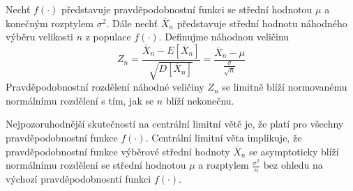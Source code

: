 \begin{theorem}
Nechť $f(\cdot)$ představuje pravděpodobnostní funkci se střední hodnotou $\mu$ a konečným rozptylem $\sigma^2$. Dále nechť $\overline{X}_n$ představuje střední hodnotu náhodného výběru velikosti $n$ z populace $f(\cdot)$. Definujme náhodnou veličinu
\begin{equation*}
Z_n = \frac{\overline{X}_n - E[\overline{X}_n]}{\sqrt{D[\overline{X}_n]}} = \frac{\overline{X}_n - \mu}{\frac{\sigma}{\sqrt{n}}}
\end{equation*}
Pravděpodobnostní rozdělení náhodné veličiny $Z_n$ se limitně blíží normovanému normálnímu rozdělení s tím, jak se $n$ blíží nekonečnu.
\end{theorem}
Nejpozoruhodnější skutečností na centrální limitní větě je, že platí pro všechny pravděpodobnostní funkce $f(\cdot)$. Centrální limitní věta implikuje, že pravděpodobnostní funkce výběrové střední hodnoty $\overline{X}_n$ se asymptoticky blíží normálnímu rozdělení se střední hodnotou $\mu$ a rozptylem $\frac{\sigma^2}{n}$ bez ohledu na výchozí pravděpodobnosntí funkci $f(\cdot)$.

